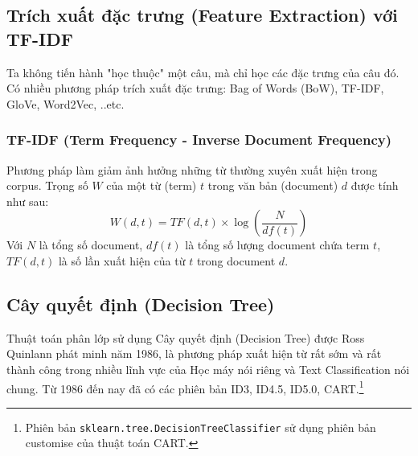 \documentclass[12pt]{article}
\begin{document}
\subsection{Trích xuất đặc trưng (Feature Extraction) với TF-IDF}
Ta không tiến hành "học thuộc" một câu, mà chỉ học các đặc trưng của câu đó. Có nhiều phương pháp trích xuất đặc trưng: Bag of Words (BoW), TF-IDF, GloVe, Word2Vec, ..etc.

\subsubsection{TF-IDF (Term Frequency - Inverse Document Frequency)}
Phương pháp làm giảm ảnh hưởng những từ thường xuyên xuất hiện trong corpus. Trọng số $W$ của một từ (term) $t$ trong văn bản (document) $d$ được tính như sau:
$$
W(d, t) = TF(d, t) \times \log\left(\frac{N}{df(t)}\right)
$$
Với $N$ là tổng số document, $df(t)$ là tổng số lượng document chứa term $t$, $TF(d, t)$ là số lần xuất hiện của từ $t$ trong document $d$.

\subsection{Cây quyết định (Decision Tree)}
Thuật toán phân lớp sử dụng Cây quyết định (Decision Tree) được Ross Quinlann phát minh năm 1986\cite{DBLP:journals/ml/Quinlan86}, là phương pháp xuất hiện từ rất sớm và rất thành công trong nhiều lĩnh vực của Học máy nói riêng và Text Classification nói chung. Từ 1986 đến nay đã có các phiên bản ID3, ID4.5, ID5.0, CART.\footnote{Phiên bản \texttt{sklearn.tree.DecisionTreeClassifier} sử dụng phiên bản customise của thuật toán CART.\cite{scikit-learn}}
\end{document}
